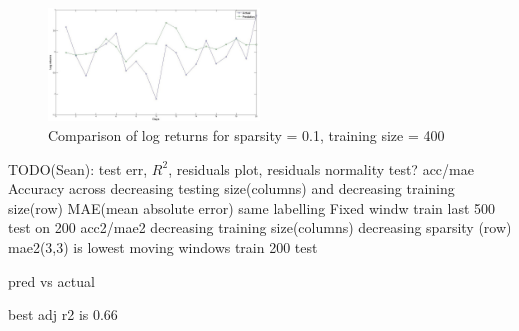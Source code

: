 \begin{figure}[h!]
	\caption{Comparison of log returns for sparsity = 0.1, training size = 400}
	\includegraphics[width=0.5\textwidth]{results/prediction.jpg}
\end{figure}


TODO(Sean): test err, $R^2$, residuals plot, residuals normality test?
acc/mae
Accuracy across decreasing testing size(columns) and decreasing training size(row)
MAE(mean absolute error) same labelling
Fixed windw train last 500 test on 200
acc2/mae2
decreasing training size(columns) decreasing sparsity (row)
mae2(3,3) is lowest
moving windows train 200 test 

pred vs actual

best adj r2 is 0.66

